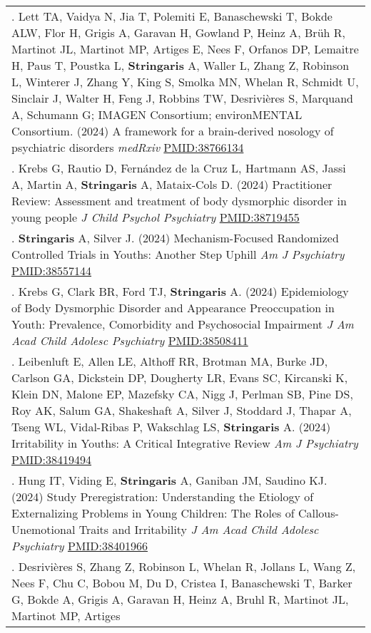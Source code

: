 \documentclass[
]{article}
\begin{document}
\begin{longtable}[]{@{}
  >{\raggedright\arraybackslash}p{}@{}}
\toprule\noalign{}
\endhead
\bottomrule\noalign{}
\endlastfoot
1. Lett TA, Vaidya N, Jia T, Polemiti E, Banaschewski T, Bokde ALW, Flor
H, Grigis A, Garavan H, Gowland P, Heinz A, Brüh R, Martinot JL,
Martinot MP, Artiges E, Nees F, Orfanos DP, Lemaitre H, Paus T, Poustka
L, \textbf{Stringaris} A, Waller L, Zhang Z, Robinson L, Winterer J,
Zhang Y, King S, Smolka MN, Whelan R, Schmidt U, Sinclair J, Walter H,
Feng J, Robbins TW, Desrivières S, Marquand A, Schumann G; IMAGEN
Consortium; environMENTAL Consortium. (2024) A framework for a
brain-derived nosology of psychiatric disorders \emph{medRxiv}
\url{PMID:38766134} \\
2. Krebs G, Rautio D, Fernández de la Cruz L, Hartmann AS, Jassi A,
Martin A, \textbf{Stringaris} A, Mataix-Cols D. (2024) Practitioner
Review: Assessment and treatment of body dysmorphic disorder in young
people \emph{J Child Psychol Psychiatry} \url{PMID:38719455} \\
3. \textbf{Stringaris} A, Silver J. (2024) Mechanism-Focused Randomized
Controlled Trials in Youths: Another Step Uphill \emph{Am J Psychiatry}
\url{PMID:38557144} \\
4. Krebs G, Clark BR, Ford TJ, \textbf{Stringaris} A. (2024)
Epidemiology of Body Dysmorphic Disorder and Appearance Preoccupation in
Youth: Prevalence, Comorbidity and Psychosocial Impairment \emph{J Am
Acad Child Adolesc Psychiatry} \url{PMID:38508411} \\
5. Leibenluft E, Allen LE, Althoff RR, Brotman MA, Burke JD, Carlson GA,
Dickstein DP, Dougherty LR, Evans SC, Kircanski K, Klein DN, Malone EP,
Mazefsky CA, Nigg J, Perlman SB, Pine DS, Roy AK, Salum GA, Shakeshaft
A, Silver J, Stoddard J, Thapar A, Tseng WL, Vidal-Ribas P, Wakschlag
LS, \textbf{Stringaris} A. (2024) Irritability in Youths: A Critical
Integrative Review \emph{Am J Psychiatry} \url{PMID:38419494} \\
6. Hung IT, Viding E, \textbf{Stringaris} A, Ganiban JM, Saudino KJ.
(2024) Study Preregistration: Understanding the Etiology of
Externalizing Problems in Young Children: The Roles of
Callous-Unemotional Traits and Irritability \emph{J Am Acad Child
Adolesc Psychiatry} \url{PMID:38401966} \\
7. Desrivières S, Zhang Z, Robinson L, Whelan R, Jollans L, Wang Z, Nees
F, Chu C, Bobou M, Du D, Cristea I, Banaschewski T, Barker G, Bokde A,
Grigis A, Garavan H, Heinz A, Bruhl R, Martinot JL, Martinot MP, Artiges

\end{longtable}
\end{document}
